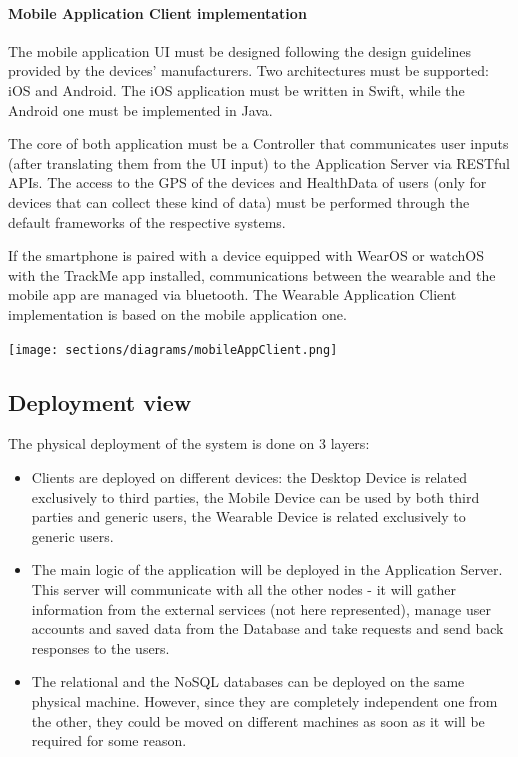 \paragraph{Mobile Application Client implementation}
The mobile application UI must be designed following the design guidelines provided by the devices’ manufacturers. Two architectures must be supported: iOS and Android. The iOS application must be written in Swift, while the Android one must be implemented in Java.

The core of both application must be a Controller that communicates user inputs (after translating them from the UI input) to the Application Server via RESTful APIs. The access to the GPS of the devices and HealthData of users (only for devices that can collect these kind of data) must be performed through the default frameworks of the respective systems.

If the smartphone is paired with a device equipped with WearOS or watchOS with the TrackMe app installed, communications between the wearable and the mobile app are managed via bluetooth. The Wearable Application Client implementation is based on the mobile application one.

\begin{center}
\texttt{[image: sections/diagrams/mobileAppClient.png]}
\newline
{}
\end{center}

\subsection{Deployment view}
The physical deployment of the system is done on 3 layers:
\begin{itemize}
\item Clients are deployed on different devices: the Desktop Device is related exclusively to third parties, the Mobile Device can be used by both third parties and generic users, the Wearable Device is related exclusively to generic users.

\item  The main logic of the application will be deployed in the Application Server. This server will communicate with all the other nodes - it will gather information from the external services (not here represented), manage user accounts and saved data from the Database and take requests and send back responses to the users.

\item The relational and the NoSQL databases can be deployed on the same physical machine. However, since they are completely independent one from the other, they could be moved on different machines as soon as it will be required for some reason.
\end{itemize}

